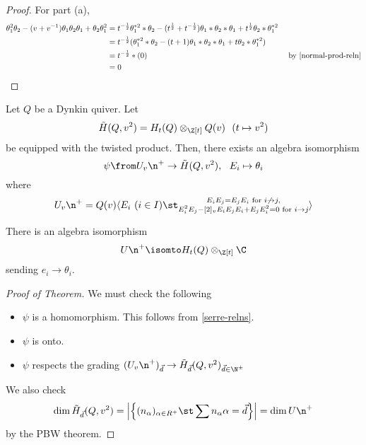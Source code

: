 \documentclass[11pt,leqno,oneside]{amsbook}
\numberwithin{thm}{section}
\renewcommand{\Q}{Q} %
\renewcommand{\roots}{R} %
\newcommand{\U}{U}
\begin{document}
  \begin{proof}
    For part (a),
    \begin{align*}
      \theta_1^2 \theta_2 - (v+v^{-1})\theta_1 \theta_2 \theta_1
      + \theta_2 \theta_1^2
      & = t^{-\frac{1}{2}} \theta_1^{*2} *
        \theta_2 - (t^{\frac{1}{2}} + t^{-\frac{1}{2}}) \theta_1 *
        \theta_2 * \theta_1 + t^{\frac{1}{2}} \theta_2 * \theta_1^{*2}
      \\
      & = t^{-\frac{1}{2}} (\theta_1^{*2} *
        \theta_2 - (t + 1) \theta_1 *
        \theta_2 * \theta_1 + t \theta_2 * \theta_1^{*2}) \\
      & = t^{-\frac{1}{2}} * (0) & \text{ by \ref{normal-prod-reln}}
      \\
      & = 0
    \end{align*}
  \end{proof}
  \begin{thm}
    Let \(\Q\) be a Dynkin quiver. Let \[
      \tilde{H}(\Q, v^2) = H_t(\Q) \otimes_{\Z[t]} \Q(v) \ \ (t
      \mapsto v^2)
    \]
    be equipped with the twisted product. Then, there exists an
    algebra isomorphism \[
      \psi \from \U_v \n^+ \to \tilde{H}(\Q, v^2), \ \ E_i \mapsto \theta_i
    \]
    where \[
      \U_v \n^+ = \Q(v) \langle E_i \ (i \in I) \st \substack{E_i E_j = E_j E_i
      \text{ for } i \not\to j, \\ E_i^2 E_j - [2]_v E_i E_j E_i + E_j
      E_i^2 = 0 \text{ for } i \to j} \rangle
    \]
  \end{thm}
  \begin{cor}
    There is an algebra isomorphism \[
      U \n^+ \isomto H_t(\Q) \otimes_{\Z[t]} \C
    \]
    sending \(e_i \to \theta_i\).
  \end{cor}
  \begin{proof}[Proof of Theorem]
    We must check the following
    \begin{itemize}
    \item \(\psi\) is a homomorphism. This follows from
      \ref{serre-relns}.
    \item \(\psi\) is onto.
    \item \(\psi\) respects the grading \((\U_v \n^+)_{\vec{d}} \to
      \tilde{H}_{\vec{d}} (\Q,v^2)_{\vec{d} \in \N^\pm}\)
    \end{itemize}
    We also check \[
      \dim \tilde{H}_{\vec{d}} (\Q, v^2) = \left| \left\{
          (n_\alpha)_{\alpha \in \roots^+} \st \sum n_\alpha \alpha =
          \vec{d} \right\} \right| = \dim \U \n^+
    \]
    by the PBW theorem.
  \end{proof}
\end{document}
